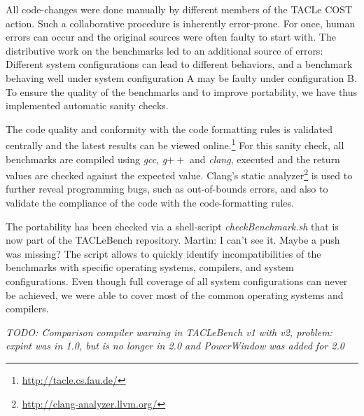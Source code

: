 \documentclass[a4paper,UKenglish]{oasics}
\newcommand{\todo}[1]{{\emph{TODO: #1}}}
\newcommand{\martin}[1]{{\color{blue} Martin: #1}}
\begin{document}
All code-changes were done manually by different members of the TACLe COST action.
Such a collaborative procedure is inherently error-prone.
For once, human errors can occur and the original sources were often faulty to start with.
The distributive work on the benchmarks led to an additional source of errors:
Different system configurations can lead to different behaviors, and a benchmark behaving well under system configuration A may be faulty under configuration B.
To ensure the quality of the benchmarks and to improve portability, we have thus implemented automatic sanity checks.

The code quality and conformity with the code formatting rules is validated centrally and the latest results can be viewed online.\footnote{\url{http://tacle.cs.fau.de/}}
For this sanity check, all benchmarks are compiled using \textit{gcc}, \textit{g$++$} and \textit{clang}, executed and the return values are checked against the expected value.
Clang's static analyzer\footnote{\url{http://clang-analyzer.llvm.org/}} is used to further reveal programming bugs, such as out-of-bounds errors, and also to validate the compliance of the code with the code-formatting rules.

The portability has been checked via a shell-script \textit{checkBenchmark.sh} that is now part of the TACLeBench repository.
\martin{I can't see it. Maybe a push was missing?}
The script allows to quickly identify incompatibilities of the benchmarks with specific operating systems, compilers, and system configurations.
Even though full coverage of all system configurations can never be achieved, we were able to cover most of the common operating systems and compilers.


\todo{Comparison compiler warning in TACLeBench v1 with v2, problem: expint was in 1.0, but is no
longer in 2.0 and PowerWindow was added for 2.0}

%
\end{document}
